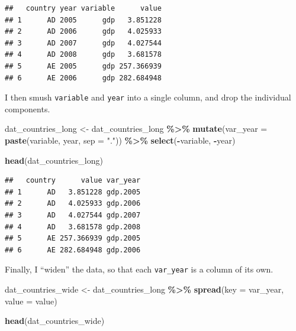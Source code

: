 \documentclass[
  12pt,
  oneside,openany]{book}
\newenvironment{Shaded}{\begin{snugshade}}{\end{snugshade}}
\newcommand{\DataTypeTok}[1]{\textcolor[rgb]{0.13,0.29,0.53}{#1}}
\newcommand{\KeywordTok}[1]{\textcolor[rgb]{0.13,0.29,0.53}{\textbf{#1}}}
\newcommand{\NormalTok}[1]{#1}
\newcommand{\OperatorTok}[1]{\textcolor[rgb]{0.81,0.36,0.00}{\textbf{#1}}}
\newcommand{\StringTok}[1]{\textcolor[rgb]{0.31,0.60,0.02}{#1}}
\begin{document}
\begin{verbatim}
##   country year variable      value
## 1      AD 2005      gdp   3.851228
## 2      AD 2006      gdp   4.025933
## 3      AD 2007      gdp   4.027544
## 4      AD 2008      gdp   3.681578
## 5      AE 2005      gdp 257.366939
## 6      AE 2006      gdp 282.684948
\end{verbatim}

I then smush \texttt{variable} and \texttt{year} into a single column, and drop the individual components.

\begin{Shaded}
\begin{Highlighting}[]
\NormalTok{dat\_countries\_long \textless{}{-}}\StringTok{ }\NormalTok{dat\_countries\_long }\OperatorTok{\%\textgreater{}\%}
\StringTok{  }\KeywordTok{mutate}\NormalTok{(}\DataTypeTok{var\_year =} \KeywordTok{paste}\NormalTok{(variable, year, }\DataTypeTok{sep =} \StringTok{"."}\NormalTok{)) }\OperatorTok{\%\textgreater{}\%}
\StringTok{  }\KeywordTok{select}\NormalTok{(}\OperatorTok{{-}}\NormalTok{variable, }\OperatorTok{{-}}\NormalTok{year)}

\KeywordTok{head}\NormalTok{(dat\_countries\_long)}
\end{Highlighting}
\end{Shaded}

\begin{verbatim}
##   country      value var_year
## 1      AD   3.851228 gdp.2005
## 2      AD   4.025933 gdp.2006
## 3      AD   4.027544 gdp.2007
## 4      AD   3.681578 gdp.2008
## 5      AE 257.366939 gdp.2005
## 6      AE 282.684948 gdp.2006
\end{verbatim}

Finally, I ``widen'' the data, so that each \texttt{var\_year} is a column of its own.

\begin{Shaded}
\begin{Highlighting}[]
\NormalTok{dat\_countries\_wide \textless{}{-}}\StringTok{ }\NormalTok{dat\_countries\_long }\OperatorTok{\%\textgreater{}\%}
\StringTok{  }\KeywordTok{spread}\NormalTok{(}\DataTypeTok{key =}\NormalTok{ var\_year, }\DataTypeTok{value =}\NormalTok{ value)}

\KeywordTok{head}\NormalTok{(dat\_countries\_wide)}
\end{Highlighting}
\end{Shaded}
\end{document}
